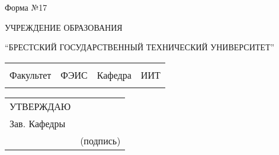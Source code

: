 \documentclass[12pt, А4]{article} %
\begin{document}


    \begin{FlushRight} %
    \fontsize{11}{13.75} \textsf{Форма №17} 
    \end{FlushRight} %

\fontsize{14}{17.5} %


    \begin{Center} %

    \textrm{ УЧРЕЖДЕНИЕ ОБРАЗОВАНИЯ}
    \par %
    \textrm{“БРЕСТСКИЙ ГОСУДАРСТВЕННЫЙ ТЕХНИЧЕСКИЙ УНИВЕРСИТЕТ”}

    \end{Center}  %

\fontsize{12}{15} %

    \begin{FlushLeft} %

    \begin{tabular}{p{2.2cm} p{5.8cm} p{2.2cm} p{5.75cm}} %
        & & %
        \\ %
        \textsf{Факультет} & 
        \centering \textsf{ФЭИС} \vspace{1pt} \hline &
        \textsf{Кафедра} &
        \centering \textsf{ИИТ} \vspace{1pt} \hline 
        \\ %
        & & %
    \end{tabular} %

    \begin{tabular}{p{2.8cm} p{5.25cm}} %
        \textsf{УТВЕРЖДАЮ} & 
        \\ %
        \textsf{Зав. Кафедры} &
        \vspace{1pt} \hline 
        \\ %
        \hspace{2.8cm} &  \centering \textsf{(подпись)}
    \end{tabular} %

    \end{FlushLeft} %
\end{document}
